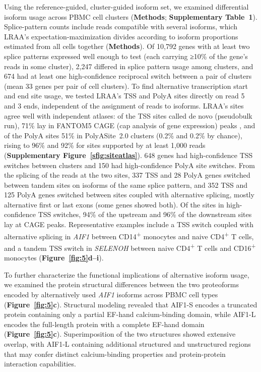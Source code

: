 Using the reference-guided, cluster-guided isoform set, we examined differential isoform usage across PBMC cell clusters (\textbf{Methods}; \textbf{Supplementary Table~1}). Splice-pattern counts include reads compatible with several isoforms, which LRAA's expectation-maximization divides according to isoform proportions estimated from all cells together (\textbf{Methods}). Of 10,792 genes with at least two splice patterns expressed well enough to test (each carrying ≥10\% of the gene's reads in some cluster), 2,247 differed in splice pattern usage among clusters, and 674 had at least one high-confidence reciprocal switch between a pair of clusters (mean 33 genes per pair of cell clusters). To find alternative transcription start and end site usage, we tested LRAA's TSS and PolyA sites directly on read 5\p{} and 3\p{} ends, independent of the assignment of reads to isoforms. LRAA's sites agree well with independent atlases: of the TSS sites called de novo (pseudobulk run), 71\% lay in FANTOM5 CAGE (cap analysis of gene expression) peaks \citep{forrest2014}, and of the PolyA sites 51\% in PolyASite~2.0 clusters \citep{herrmann2020} (0.2\% and 0.2\% by chance), rising to 96\% and 92\% for sites supported by at least 1,000 reads (\textbf{Supplementary Figure~\ref{sfig:siteatlas}}). 648 genes had high-confidence TSS switches between clusters and 150 had high-confidence PolyA site switches. From the splicing of the reads at the two sites, 337 TSS and 28 PolyA genes switched between tandem sites on isoforms of the same splice pattern, and 352 TSS and 125 PolyA genes switched between sites coupled with alternative splicing, mostly alternative first or last exons (some genes showed both). Of the sites in high-confidence TSS switches, 94\% of the upstream and 96\% of the downstream sites lay at CAGE peaks. Representative examples include a TSS switch coupled with alternative splicing in \emph{AIF1} between CD14\textsuperscript{+} monocytes and naive CD4\textsuperscript{+} T cells, and a tandem TSS switch in \emph{SELENOH} between naive CD4\textsuperscript{+} T cells and CD16\textsuperscript{+} monocytes (\textbf{Figure~\ref{fig:5}d--i}).

To further characterize the functional implications of alternative isoform usage, we examined the protein structural differences between the two proteoforms encoded by alternatively used \emph{AIF1} isoforms across PBMC cell types (\textbf{Figure~\ref{fig:5}c}). Structural modeling revealed that AIF1-S encodes a truncated protein containing only a partial EF-hand calcium-binding domain, while AIF1-L encodes the full-length protein with a complete EF-hand domain (\textbf{Figure~\ref{fig:5}c}). Superimposition of the two structures showed extensive overlap, with AIF1-L containing additional structured and unstructured regions that may confer distinct calcium-binding properties and protein-protein interaction capabilities.

